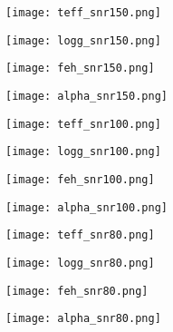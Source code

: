 \documentclass[fleqn,usenatbib]{mnras}
\begin{document}
\begin{figure*}%
 \centering
 \begin{minipage}{0.21\textwidth}
  \texttt{[image: teff\_snr150.png]} 
 \end{minipage}
\hspace{0.02\textwidth}%
 \begin{minipage}{0.21\textwidth}
  \texttt{[image: logg\_snr150.png]} 
 \end{minipage}
\hspace{0.02\textwidth}%
 \begin{minipage}{0.21\textwidth}
  \texttt{[image: feh\_snr150.png]} 
 \end{minipage}
\hspace{0.02\textwidth}%
 \begin{minipage}{0.21\textwidth}
  \texttt{[image: alpha\_snr150.png]} 
 \end{minipage}

 \centering
 \begin{minipage}{0.21\textwidth}
  \texttt{[image: teff\_snr100.png]} 
 \end{minipage}
\hspace{0.02\textwidth}%
 \begin{minipage}{0.21\textwidth}
  \texttt{[image: logg\_snr100.png]} 
 \end{minipage}
\hspace{0.02\textwidth}%
 \begin{minipage}{0.21\textwidth}
  \texttt{[image: feh\_snr100.png]} 
 \end{minipage}
\hspace{0.02\textwidth}%
 \begin{minipage}{0.21\textwidth}
  \texttt{[image: alpha\_snr100.png]} 
 \end{minipage}

 \centering
 \begin{minipage}{0.21\textwidth}
  \texttt{[image: teff\_snr80.png]} 
 \end{minipage}
\hspace{0.02\textwidth}%
 \begin{minipage}{0.21\textwidth}
  \texttt{[image: logg\_snr80.png]} 
 \end{minipage}
\hspace{0.02\textwidth}%
 \begin{minipage}{0.21\textwidth}
  \texttt{[image: feh\_snr80.png]} 
 \end{minipage}
\hspace{0.02\textwidth}%
 \begin{minipage}{0.21\textwidth}
  \texttt{[image: alpha\_snr80.png]} 
 \end{minipage}


\end{figure*}
\end{document}
